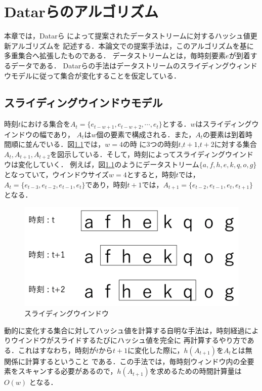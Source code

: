 \chapter{Datarらのアルゴリズム}

本章では，Datarら \cite{Datar} によって提案されたデータストリームに対するハッシュ値更新アルゴリズムを
記述する．本論文での提案手法は，このアルゴリズムを基に多重集合へ拡張したものである．
データストリームとは，毎時刻要素$e$が到着するデータである．
Datarらの手法はデータストリームのスライディングウィンドウモデルに従って集合が変化することを仮定している．

\section{スライディングウインドウモデル}
時刻$t$における集合を$A_t=\{e_{t-w+1},e_{t-w+2},\cdots,e_t\}$とする．$w$はスライディングウインドウの幅であり，
$A_t$は$w$個の要素で構成される．また，$A_t$の要素は到着時間順に並んでいる．図\ref{fig:window}では，$w=4$の時
に3つの時刻$t$,$t+1$,$t+2$に対する集合$A_t,A_{t+1},A_{t+2}$を図示している．そして，時刻によってスライディングウインドウは変化していく．
例えば，図\ref{fig:window}のようにデータストリーム$\{a,f,h,e,k,q,o,g\}$となっていて，ウインドウサイズ$w=4$とすると，時刻$t$では，
$A_{t}=\{e_{t-3},e_{t-2},e_{t-1},e_t\}$であり，時刻$t +1$では，$A_{t+1}=\{e_{t-2},e_{t-1},e_t,e_{t+1}\}$となる．

\begin{figure}[H]
 \centering
 \includegraphics[width=15cm]{3_2_Ver1.1.png}
 \caption{スライディングウインドウ}
\label{fig:window}
\end{figure}

動的に変化する集合に対してハッシュ値を計算する自明な手法は，時刻経過によりウインドウがスライドするたびにハッシュ値を完全に
再計算するやり方である．これはすなわち，時刻が$t$から$t+1$に変化した際に，$h(A_{t+1})$を$A_{t}$とは無関係に計算するということ
である．この手法では，毎時刻ウィンドウ内の全要素をスキャンする必要があるので，$h(A_{t+1})$を求めるための時間計算量は$O(w)$
となる．


